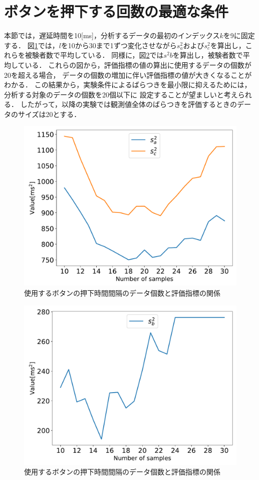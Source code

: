 \section{ボタンを押下する回数の最適な条件}
本節では，遅延時間を10[ms]，分析するデータの最初のインデックス$k$を9に固定する．
図\ref{fig:NumberofSamples_Sa_Sc}では，$l$を10から30まで1ずつ変化させながら$s^2_{a}$および$s^2_{c}$を算出し，これらを被験者数で平均している．
同様に，図\ref{fig:Numberofsamples_Sb}では$s^2{b}$を算出し，被験者数で平均している．
これらの図から，評価指標の値の算出に使用するデータの個数が20を超える場合，
データの個数の増加に伴い評価指標の値が大きくなることがわかる．
この結果から，実験条件によるばらつきを最小限に抑えるためには，分析する対象のデータの個数を20個以下に
設定することが望ましいと考えられる．
したがって，以降の実験では観測値全体のばらつきを評価するときのデータのサイズは20とする．
\begin{figure}[bt]
  \centering
  \includegraphics[scale=0.6]{figures/Yobi/Var/NumberOfSamples_varSaSc.pdf}
  \caption{使用するボタンの押下時間間隔のデータ個数と評価指標の関係}
  \label{fig:NumberofSamples_Sa_Sc}
\end{figure}
\begin{figure}[bt]
  \centering
  \includegraphics[scale=0.6]{figures/Yobi/Var/NumberOfSamples_varSb.pdf}
  \caption{使用するボタンの押下時間間隔のデータ個数と評価指標の関係}
  \label{fig:Numberofsamples_Sb}
\end{figure}

